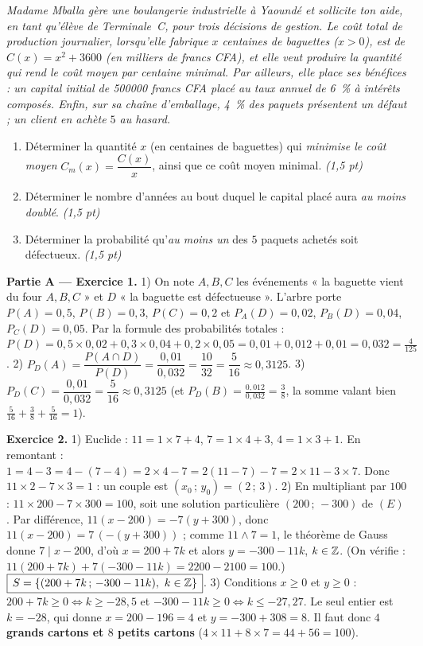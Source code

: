 \noindent\textit{Madame Mballa gère une boulangerie industrielle à Yaoundé et sollicite
ton aide, en tant qu'élève de Terminale~C, pour trois décisions de gestion. Le coût
total de production journalier, lorsqu'elle fabrique $x$ centaines de baguettes
($x>0$), est de $C(x)=x^2+3600$ (en milliers de francs CFA), et elle veut produire la
quantité qui rend le \emph{coût moyen par centaine} minimal. Par ailleurs, elle place
ses bénéfices : un capital initial de \SI{500000}{} francs CFA placé au taux annuel de
\SI{6}{\percent} à intérêts composés. Enfin, sur sa chaîne d'emballage,
\SI{4}{\percent} des paquets présentent un défaut ; un client en achète $5$ au hasard.}

\begin{enumerate}[label=\textbf{Tâche \arabic*.},leftmargin=2.4em]
\item Déterminer la quantité $x$ (en centaines de baguettes) qui \emph{minimise le coût
moyen} $C_m(x)=\dfrac{C(x)}{x}$, ainsi que ce coût moyen minimal. \hfill\textit{(1,5 pt)}
\item Déterminer le nombre d'années au bout duquel le capital placé aura \emph{au moins doublé}. \hfill\textit{(1,5 pt)}
\item Déterminer la probabilité qu'\emph{au moins un} des $5$ paquets achetés soit défectueux. \hfill\textit{(1,5 pt)}
\end{enumerate}
\par{}


\noindent\textbf{Partie A — Exercice 1.}
1) On note $A,B,C$ les événements « la baguette vient du four $A,B,C$ » et $D$
« la baguette est défectueuse ». L'arbre porte $P(A)=0{,}5$, $P(B)=0{,}3$, $P(C)=0{,}2$
et $P_A(D)=0{,}02$, $P_B(D)=0{,}04$, $P_C(D)=0{,}05$. Par la formule des probabilités totales :
$P(D)=0{,}5\times0{,}02+0{,}3\times0{,}04+0{,}2\times0{,}05=0{,}01+0{,}012+0{,}01=0{,}032=\frac{4}{125}$.
2) $P_D(A)=\dfrac{P(A\cap D)}{P(D)}=\dfrac{0{,}01}{0{,}032}=\dfrac{10}{32}=\dfrac{5}{16}\approx0{,}3125$.
3) $P_D(C)=\dfrac{0{,}01}{0{,}032}=\dfrac{5}{16}\approx0{,}3125$ (et $P_D(B)=\frac{0{,}012}{0{,}032}=\frac38$,
la somme valant bien $\frac5{16}+\frac38+\frac5{16}=1$).

\noindent\textbf{Exercice 2.}
1) Euclide : $11=1\times7+4$, $7=1\times4+3$, $4=1\times3+1$. En remontant :
$1=4-3=4-(7-4)=2\times4-7=2(11-7)-7=2\times11-3\times7$. Donc $11\times2-7\times3=1$ :
un couple est $(x_0\,;\,y_0)=(2\,;\,3)$.
2) En multipliant par $100$ : $11\times200-7\times300=100$, soit une solution
particulière $(200\,;\,-300)$ de $(E)$. Par différence, $11(x-200)=-7(y+300)$, donc
$11(x-200)=7\,(-(y+300))$ ; comme $11\wedge7=1$, le théorème de Gauss donne $7\mid x-200$,
d'où $x=200+7k$ et alors $y=-300-11k$, $k\in\mathbb{Z}$. (On vérifie : $11(200+7k)+7(-300-11k)=2200-2100=100$.)
$\boxed{\,S=\{(200+7k\,;\,-300-11k),\ k\in\Z\}\,}$.
3) Conditions $x\ge0$ et $y\ge0$ : $200+7k\ge0\iff k\ge-28{,}5$ et
$-300-11k\ge0\iff k\le-27{,}27$. Le seul entier est $k=-28$, qui donne
$x=200-196=4$ et $y=-300+308=8$. Il faut donc \textbf{$4$ grands cartons et $8$ petits cartons}
($4\times11+8\times7=44+56=100$).

